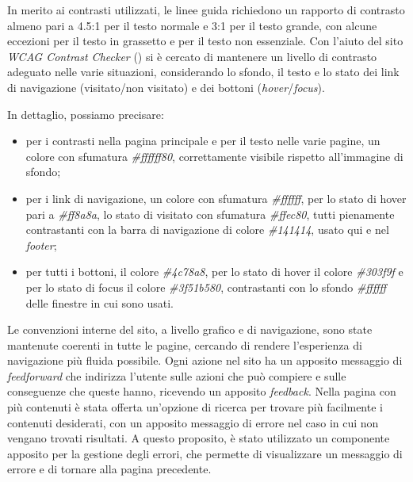 In merito ai contrasti utilizzati, le linee guida richiedono un rapporto di contrasto almeno pari a 4.5:1 per il testo normale e 3:1 per il testo grande, con alcune eccezioni per il testo in grassetto e per il testo non essenziale.
Con l'aiuto del sito \textit{WCAG Contrast Checker} (\cite{site:wcagcontrastchecker}) si è cercato di mantenere un livello di contrasto adeguato nelle varie situazioni, considerando lo sfondo, il testo e lo stato dei link di navigazione (visitato/non visitato) e dei bottoni (\textit{hover}/\textit{focus}).

In dettaglio, possiamo precisare:
\begin{itemize}
    \item per i contrasti nella pagina principale e per il testo nelle varie pagine, un colore con sfumatura \textit{\#ffffff80}, correttamente visibile rispetto all'immagine di sfondo;
    \item per i link di navigazione, un colore con sfumatura \textit{\#ffffff}, per lo stato di hover pari a \textit{\#ff8a8a}, lo stato di visitato con sfumatura \textit{\#ffec80}, tutti pienamente contrastanti con la barra di navigazione di colore \textit{\#141414}, usato qui e nel \textit{footer};
    \item per tutti i bottoni, il colore \textit{\#4c78a8}, per lo stato di hover il colore \textit{\#303f9f} e per lo stato di focus il colore \textit{\#3f51b580}, contrastanti con lo sfondo \textit{\#ffffff} delle finestre in cui sono usati.
\end{itemize}

Le convenzioni interne del sito, a livello grafico e di navigazione, sono state mantenute coerenti in tutte le pagine, cercando di rendere l'esperienza di navigazione più fluida possibile.
Ogni azione nel sito ha un apposito messaggio di \textit{feedforward} che indirizza l'utente sulle azioni che può compiere e sulle conseguenze che queste hanno, ricevendo un apposito \textit{feedback}.
Nella pagina con più contenuti è stata offerta un'opzione di ricerca per trovare più facilmente i contenuti desiderati, con un apposito messaggio di errore nel caso in cui non vengano trovati risultati.
A questo proposito, è stato utilizzato un componente apposito per la gestione degli errori, che permette di visualizzare un messaggio di errore e di tornare alla pagina precedente. \\

